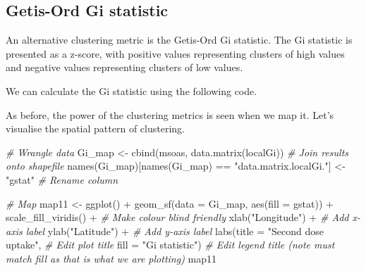 \documentclass[
]{book}
\newenvironment{Shaded}{\begin{snugshade}}{\end{snugshade}}
\newcommand{\AttributeTok}[1]{\textcolor[rgb]{0.77,0.63,0.00}{#1}}
\newcommand{\CommentTok}[1]{\textcolor[rgb]{0.56,0.35,0.01}{\textit{#1}}}
\newcommand{\FunctionTok}[1]{\textcolor[rgb]{0.00,0.00,0.00}{#1}}
\newcommand{\NormalTok}[1]{#1}
\newcommand{\OtherTok}[1]{\textcolor[rgb]{0.56,0.35,0.01}{#1}}
\newcommand{\SpecialCharTok}[1]{\textcolor[rgb]{0.00,0.00,0.00}{#1}}
\newcommand{\StringTok}[1]{\textcolor[rgb]{0.31,0.60,0.02}{#1}}
\begin{document}
\hypertarget{getis-ord-gi-statistic}{%
\subsection{Getis-Ord Gi statistic}\label{getis-ord-gi-statistic}}

An alternative clustering metric is the Getis-Ord Gi statistic. The Gi statistic is presented as a z-score, with positive values representing clusters of high values and negative values representing clusters of low values.

We can calculate the Gi statistic using the following code.

\begin{Shaded}
\end{Shaded}

As before, the power of the clustering metrics is seen when we map it. Let's visualise the spatial pattern of clustering.

\begin{Shaded}
\begin{Highlighting}[]
\CommentTok{\# Wrangle data}
\NormalTok{Gi\_map }\OtherTok{\textless{}{-}} \FunctionTok{cbind}\NormalTok{(msoas, }\FunctionTok{data.matrix}\NormalTok{(localGi)) }\CommentTok{\# Join results onto shapefile}
\FunctionTok{names}\NormalTok{(Gi\_map)[}\FunctionTok{names}\NormalTok{(Gi\_map) }\SpecialCharTok{==} \StringTok{"data.matrix.localGi."}\NormalTok{] }\OtherTok{\textless{}{-}} \StringTok{"gstat"} \CommentTok{\# Rename column}

\CommentTok{\# Map}
\NormalTok{map11 }\OtherTok{\textless{}{-}} \FunctionTok{ggplot}\NormalTok{() }\SpecialCharTok{+}
  \FunctionTok{geom\_sf}\NormalTok{(}\AttributeTok{data =}\NormalTok{ Gi\_map, }\FunctionTok{aes}\NormalTok{(}\AttributeTok{fill =}\NormalTok{ gstat)) }\SpecialCharTok{+}
  \FunctionTok{scale\_fill\_viridis}\NormalTok{() }\SpecialCharTok{+} \CommentTok{\# Make colour blind friendly}
  \FunctionTok{xlab}\NormalTok{(}\StringTok{"Longitude"}\NormalTok{) }\SpecialCharTok{+} \CommentTok{\# Add x{-}axis label}
  \FunctionTok{ylab}\NormalTok{(}\StringTok{"Latitude"}\NormalTok{) }\SpecialCharTok{+} \CommentTok{\# Add y{-}axis label}
  \FunctionTok{labs}\NormalTok{(}\AttributeTok{title =} \StringTok{"Second dose uptake"}\NormalTok{, }\CommentTok{\# Edit plot title }
       \AttributeTok{fill =} \StringTok{"Gi statistic"}\NormalTok{) }\CommentTok{\# Edit legend title (note must match fill as that is what we are plotting)}
\NormalTok{map11}
\end{Highlighting}
\end{Shaded}
\end{document}

